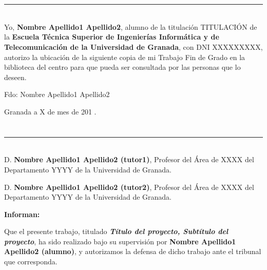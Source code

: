 \chapter*{}
\thispagestyle{empty}

\noindent\rule[-1ex]{\textwidth}{2pt}\\[4.5ex]

Yo, \textbf{Nombre Apellido1 Apellido2}, alumno de la titulación TITULACIÓN de la \textbf{Escuela Técnica Superior
de Ingenierías Informática y de Telecomunicación de la Universidad de Granada}, con DNI XXXXXXXXX, autorizo la
ubicación de la siguiente copia de mi Trabajo Fin de Grado en la biblioteca del centro para que pueda ser
consultada por las personas que lo deseen.

\vspace{6cm}

\noindent Fdo: Nombre Apellido1 Apellido2

\vspace{2cm}

\begin{flushright}
Granada a X de mes de 201 .
\end{flushright}


\chapter*{}
\thispagestyle{empty}

\noindent\rule[-1ex]{\textwidth}{2pt}\\[4.5ex]

D. \textbf{Nombre Apellido1 Apellido2 (tutor1)}, Profesor del Área de XXXX del Departamento YYYY de la Universidad de Granada.

\vspace{0.5cm}

D. \textbf{Nombre Apellido1 Apellido2 (tutor2)}, Profesor del Área de XXXX del Departamento YYYY de la Universidad de Granada.


\vspace{0.5cm}

\textbf{Informan:}

\vspace{0.5cm}

Que el presente trabajo, titulado \textit{\textbf{Título del proyecto, Subtítulo del proyecto}},
ha sido realizado bajo su supervisión por \textbf{Nombre Apellido1 Apellido2 (alumno)}, y autorizamos la defensa de dicho trabajo ante el tribunal
que corresponda.

\vspace{0.5cm}

